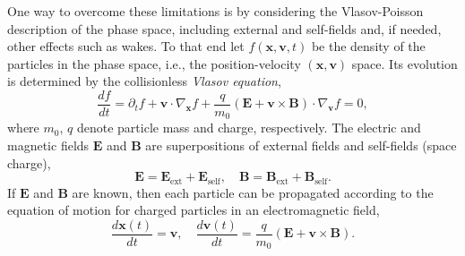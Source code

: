 \documentclass[a4paper,10pt,3p,final,pdftex]{elsarticle}
\newcommand {\RM}[1]{\mathrm{#1}}
\renewcommand{\Re}{\mathbb{R}}
\begin{document}
One way to overcome these limitations is by considering the
Vlasov-Poisson description of the phase space, including external and
self-fields and, if needed, other effects such as wakes.  To that end
let $f(\mathbf{x},\mathbf{v},t)$ be the density of the particles in the
phase space, i.e., the position-velocity $(\mathbf{x}, \mathbf{v})$
space.  Its evolution is determined by the collisionless \emph{Vlasov
  equation},
\begin{equation}\label{eq:Vlasov}
  \frac{df}{dt}=\partial_t f + \mathbf{v} \cdot \nabla_{\mathbf{x}} f
  +\frac{q}{m_0}(\mathbf{E}+ \mathbf{v}\times\mathbf{B})\cdot
  \nabla_{\mathbf{v}} f  =  0,
\end{equation}
where $m_0$, $q$ denote particle mass and charge, respectively.  The
electric and magnetic fields $\mathbf{E}$ and $\mathbf{B}$ are
superpositions of external fields and self-fields (space charge),
\begin{equation}\label{eq:allfield}
    \mathbf{E} =
    \mathbf{E_{\RM{ext}}} + \mathbf{E_{\RM{self}}}, \quad
    \mathbf{B} =
    \mathbf{B_{\RM{ext}}} + \mathbf{B_{\RM{self}}}.
\end{equation}
If $\mathbf{E}$ and $\mathbf{B}$ are known, then each particle can be
propagated according to the equation of motion for charged particles in an
electromagnetic field,
\begin{equation*}\label{eq:motion}
  \frac{d\mathbf{x}(t)}{dt}  = \mathbf{v},
  \quad
  \frac{d\mathbf{v}(t)}{dt}  = \frac{q}{m_0}\left(\mathbf{E} +
    \mathbf{v}\times \mathbf{B}\right).
\end{equation*}
\end{document}
